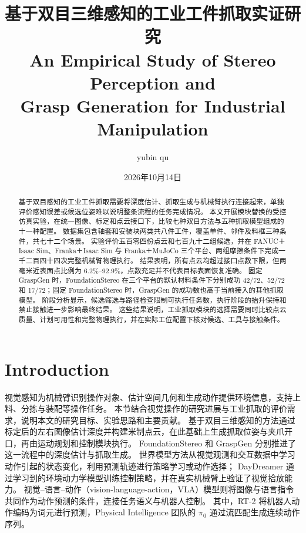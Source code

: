 \documentclass[UTF8,fontset=fandol,a4paper,11pt]{ctexart}
\title{基于双目三维感知的工业工件抓取实证研究\\[.3em]
\large An Empirical Study of Stereo Perception and\\
Grasp Generation for Industrial Manipulation}
\author{yubin qu}
\date{2026年10月14日}
\newcommand{\qyb}[1]{#1}
\begin{document}
\maketitle
\pagestyle{plain}



\begin{abstract}

基于双目感知的工业工件抓取需要将深度估计、抓取生成与机械臂执行连接起来，单独评价感知误差或候选位姿难以说明整条流程的任务完成情况。
本文开展模块替换的受控仿真实验，在统一图像、标定和点云接口下，比较七种双目方法与五种抓取模型组成的十一种配置。
数据集包含轴套和安装块两类共八件工件，覆盖单件、邻件及料框三种条件，共七十二个场景。
实验评价五百零四份点云和七百九十二组候选，并在 FANUC＋Isaac Sim、Franka＋Isaac Sim 与 Franka＋MuJoCo 三个平台、两组摩擦条件下完成一千二百四十四次完整机械臂物理执行。
结果表明，所有点云均超过接口点数下限，但两毫米近表面点比例为 6.2\%--92.9\%，点数充足并不代表目标表面恢复准确。
固定 GraspGen 时，FoundationStereo 在三个平台的默认材料条件下分别成功 42/72、52/72 和 17/72；固定 FoundationStereo 时，GraspGen 的成功数也高于当前接入的其他抓取模型。
阶段分析显示，候选筛选与路径检查限制可执行任务数，执行阶段的抬升保持和禁止接触进一步影响最终结果。
这些结果说明，工业抓取模块的选择需要同时比较点云质量、计划可用性和完整物理执行，并在实际工位配置下核对候选、工具与接触条件。

\end{abstract}

\section{\qyb{Introduction}}
\label{sec:intro}

视觉感知为机械臂识别操作对象、估计空间几何和生成动作提供环境信息，支持上料、分拣与装配等操作任务。
本节结合视觉操作的研究进展与工业抓取的评价需求，说明本文的研究目标、实验思路和主要贡献。
基于双目三维感知的方法通过标定后的左右图像估计深度并构建米制点云，在此基础上生成抓取位姿与夹爪开口，再由运动规划和控制模块执行。
FoundationStereo 和 GraspGen 分别推进了这一流程中的深度估计与抓取生成\cite{wen2025,murali2026}。
世界模型方法从视觉观测和交互数据中学习动作引起的状态变化，利用预测轨迹进行策略学习或动作选择；
DayDreamer 通过学习到的环境动力学模型训练控制策略，并在真实机械臂上验证了视觉拾放能力\cite{wu2023daydreamer}。
视觉--语言--动作（vision-language-action，VLA）模型则将图像与语言指令共同作为动作预测的条件，连接任务语义与机器人控制。
其中，RT-2 将机器人动作编码为词元进行预测，Physical Intelligence 团队的 $\pi_0$ 通过流匹配生成连续动作序列\cite{brohan2023rt2,black2025pi0}。
\end{document}
